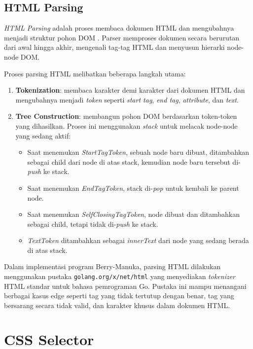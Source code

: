 \subsection{HTML Parsing}

\textit{HTML Parsing} adalah proses membaca dokumen HTML dan mengubahnya menjadi
struktur pohon DOM \cite{whatwg_html}. Parser memproses dokumen secara berurutan
dari awal hingga akhir, mengenali tag-tag HTML dan menyusun hierarki node-node
DOM.

Proses parsing HTML melibatkan beberapa langkah utama:

\begin{enumerate}
    \item \textbf{Tokenization}: membaca karakter demi karakter dari dokumen
    HTML dan mengubahnya menjadi \textit{token} seperti \textit{start tag},
    \textit{end tag}, \textit{attribute}, dan \textit{text}.
    
    \item \textbf{Tree Construction}: membangun pohon DOM berdasarkan token-token
    yang dihasilkan. Proses ini menggunakan \textit{stack} untuk melacak node-node
    yang sedang aktif:
    \begin{itemize}
        \item Saat menemukan \textit{StartTagToken}, sebuah node baru dibuat,
        ditambahkan sebagai child dari node di atas stack, kemudian node baru
        tersebut di-\textit{push} ke stack.
        \item Saat menemukan \textit{EndTagToken}, stack di-\textit{pop} untuk
        kembali ke parent node.
        \item Saat menemukan \textit{SelfClosingTagToken}, node dibuat dan
        ditambahkan sebagai child, tetapi tidak di-\textit{push} ke stack.
        \item \textit{TextToken} ditambahkan sebagai \textit{innerText} dari
        node yang sedang berada di atas stack.
    \end{itemize}
\end{enumerate}

Dalam implementasi program Berry-Manuka, parsing HTML dilakukan menggunakan
pustaka \texttt{golang.org/x/net/html} yang menyediakan \textit{tokenizer} HTML
standar untuk bahasa pemrograman Go. Pustaka ini mampu menangani berbagai kasus
edge seperti tag yang tidak tertutup dengan benar, tag yang bersarang secara
tidak valid, dan karakter khusus dalam dokumen HTML.

\section{CSS Selector}

